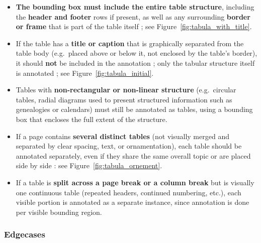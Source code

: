 \begin{itemize}
  \item \textbf{The bounding box must include the entire table structure}, including the \textbf{header and footer} rows if present, as well as any surrounding \textbf{border or frame} that is part of the table itself ; see Figure~\ref{fig:tabula_with_title}.

  \item If the table has a \textbf{title or caption} that is graphically separated from the table body (e.g.\ placed above or below it, not enclosed by the table's border), it should \textbf{not} be included in the annotation ; only the tabular structure itself is annotated ; see Figure~\ref{fig:tabula_initial}.

  \item Tables with \textbf{non-rectangular or non-linear structure} (e.g.\ circular tables, radial diagrams used to present structured information such as genealogies or calendars) must still be annotated as tables, using a bounding box that encloses the full extent of the structure.

  \item If a page contains \textbf{several distinct tables} (not visually merged and separated by clear spacing, text, or ornamentation), each table should be annotated separately, even if they share the same overall topic or are placed side by side : see Figure~\ref{fig:tabula_ornement}.

  \item If a table is \textbf{split across a page break or a column break} but is visually one continuous table (repeated headers, continued numbering, etc.), each visible portion is annotated as a separate instance, since annotation is done per visible bounding region.
\end{itemize}

\subsubsection{Edgecases}

